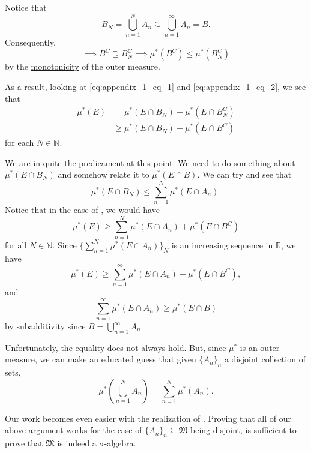 \documentclass[notoc,notitlepage]{tufte-book}
\begin{document}
Notice that
\begin{equation*}
  B_N = \bigcup_{n=1}^{N} A_n \subseteq \bigcup_{n=1}^{\infty} A_n = B.
\end{equation*}
Consequently,
\begin{equation*}
  \implies B^C \supseteq B_N^C \implies \mu^*(B^C) \leq \mu^*(B_N^C)
\end{equation*}
by the \hyperref[defn:outer_measure]{monotonicity} of the outer measure.

As a result, looking at \cref{eq:appendix_1_eq_1} and \cref{eq:appendix_1_eq_2},
we see that
\begin{align*}
  \mu^*(E) &= \mu^*(E \cap B_N) + \mu^*(E \cap B_N^C) \\
           &\geq \mu^*(E \cap B_N) + \mu^*(E \cap B^C)
\end{align*}
for each $N \in \mathbb{N}$.

We are in quite the predicament at this point.
We need to do something about $\mu^*(E \cap B_N)$
and somehow relate it to $\mu^*(E \cap B)$.
We can try and see that
\begin{equation*}
  \mu^*(E \cap B_N) \leq \sum_{n=1}^{N} \mu^*(E \cap A_n).
\end{equation*}
Notice that in the case of , we would have
\begin{equation*}
  \mu^*(E) \geq \sum_{n=1}^{N} \mu^*(E \cap A_n) + \mu^*(E \cap B^C)
\end{equation*}
for all $N \in \mathbb{N}$.
Since $\{ \sum_{n=1}^{N} \mu^*(E \cap A_n) \}_{N}$ is an increasing sequence
in $\mathbb{R}$, we have
\begin{equation*}
  \mu^*(E) \geq \sum_{n=1}^{\infty} \mu^*(E \cap A_n) + \mu^*(E \cap B^C),
\end{equation*}
and
\begin{equation*}
  \sum_{n=1}^{\infty} \mu^*(E \cap A_n) \geq \mu^*(E \cap B)
\end{equation*}
by subadditivity since $B = \bigcup_{n=1}^{\infty} A_n$.

Unfortunately, the equality does not always hold.
But, since $\mu^*$ is an outer measure,
we can make an educated guess
that given $\{ A_n \}_{n}$ a disjoint collection of sets,
\begin{equation*}
  \mu^* \left( \bigcup_{n=1}^{N} A_n \right) = \sum_{n=1}^{N} \mu^*(A_n).
\end{equation*}

Our work becomes even easier with the realization of .
Proving that all of our above argument works for the case of
$\{ A_n \}_{n} \subseteq \mathfrak{M}$ being disjoint,
is sufficient to prove that $\mathfrak{M}$ is indeed a $\sigma$-algebra.
\end{document}
